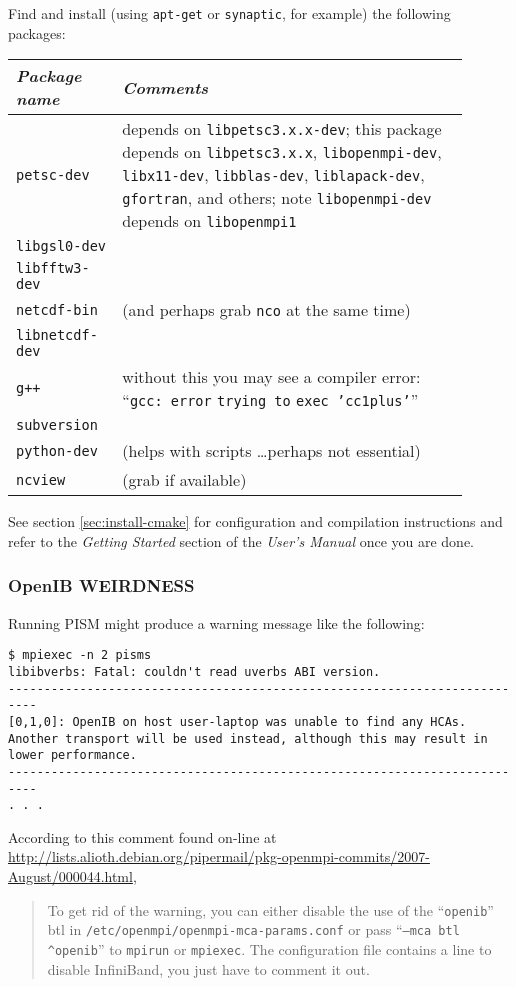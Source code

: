 \documentclass[11pt,final]{amsart}
\begin{document}
Find and install (using \texttt{apt-get} or \texttt{synaptic}, for example) the following packages:
  \begin{center}
    \begin{tabular*}{0.9\linewidth}{p{0.2\linewidth}p{0.7\linewidth}}
      \toprule
      \emph{Package name} & \emph{Comments}\\
      \midrule
      \texttt{petsc-dev} & depends on \texttt{libpetsc3.x.x-dev}; this package 
      depends on \texttt{libpetsc3.x.x}, \texttt{libopenmpi-dev}, \texttt{libx11-dev},
      \texttt{libblas-dev}, \texttt{liblapack-dev}, \texttt{gfortran}, and others; 
      note \texttt{libopenmpi-dev} depends on \texttt{libopenmpi1}\\
      \texttt{libgsl0-dev} & \\
      \texttt{libfftw3-dev} & \\
      \texttt{netcdf-bin} & (and perhaps grab \texttt{nco} at the same time)\\
      \texttt{libnetcdf-dev} & \\
      \texttt{g++} & without this you may see a compiler error: ``\texttt{gcc: error} \texttt{trying to} \texttt{exec 'cc1plus'}''\\
      \texttt{subversion} & \\
      \texttt{python-dev} & (helps with scripts \dots perhaps not essential) \\
      \texttt{ncview} & (grab if available) \\
      \bottomrule
    \end{tabular*}
  \end{center}

See section \ref{sec:install-cmake} for configuration and compilation instructions and refer to the \emph{Getting Started} section
of the \emph{User's Manual} once you are done.

\vspace{0.3in}

\subsubsection*{OpenIB WEIRDNESS} Running PISM might produce a warning message like the following:
\begin{verbatim}
$ mpiexec -n 2 pisms
libibverbs: Fatal: couldn't read uverbs ABI version.
--------------------------------------------------------------------------
[0,1,0]: OpenIB on host user-laptop was unable to find any HCAs.
Another transport will be used instead, although this may result in 
lower performance.
--------------------------------------------------------------------------
. . .
\end{verbatim}
According to this comment found on-line at \url{http://lists.alioth.debian.org/pipermail/pkg-openmpi-commits/2007-August/000044.html},
\begin{quote}
   To get rid of the warning, you can either disable the use of the ``\texttt{openib}'' btl
   in \texttt{/etc/openmpi/openmpi-mca-params.conf} or pass ``\texttt{--mca btl \^{}openib}'' to \texttt{mpirun}
   or \texttt{mpiexec}.  The configuration file contains a line to disable InfiniBand, you
   just have to comment it out.
\end{quote}
\bigskip
\end{document}
